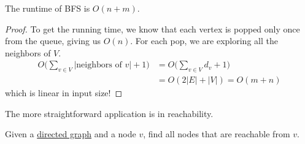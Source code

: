   \begin{theorem}
    \label{thm:runtime-of-bfs}
    The runtime of BFS is $O(n+m)$. 
  \end{theorem}
  \begin{proof}
    To get the running time, we know that each vertex is popped only once from the queue, giving us $O(n)$. For each pop, we are exploring all the neighbors of $V$. 
    \begin{align}
      O \bigg( \sum_{v \in V} | \text{neighbors of } v| + 1\bigg) & = O \bigg( \sum_{v \in V} d_v + 1 \bigg) \\
                                           & = O (2 |E| + |V|) = O(m + n )
    \end{align}
    which is linear in input size!  
  \end{proof}

  The more straightforward application is in reachability. 

  \begin{example}[Reachability]
    \label{ex:reachability}
    Given a \hyperref[def:directed-graph]{directed graph} and a node $v$, find all nodes that are reachable from $v$. 
  \end{example}

